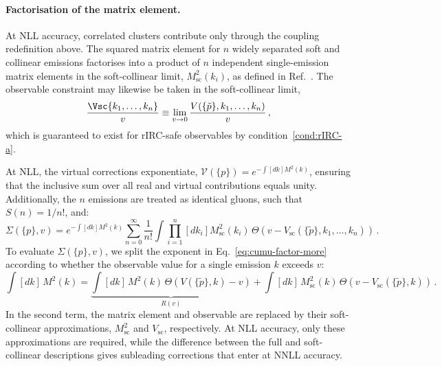\paragraph{Factorisation of the matrix element.} 
At NLL accuracy, correlated clusters contribute only through the 
coupling redefinition above. The squared matrix element for $n$ widely 
separated soft and collinear emissions factorises into a product of 
$n$ independent single-emission matrix elements in the soft-collinear 
limit, $M_{\mathrm{sc}}^2(k_i)$, as defined in 
Ref.~\cite{Banfi:2014sua}. The observable constraint may likewise be 
taken in the soft-collinear limit,  
\begin{equation}
  \label{eq:Vsc}
  \frac{\Vsc{k_1,\dots,k_n}}{v}
  \equiv \lim_{v\to 0}\frac{V(\{\tilde{p}\},k_1,\dots,k_n)}{v}\,,
\end{equation}
which is guaranteed to exist for rIRC-safe observables by condition~\ref{cond:rIRC-a}.

At NLL, the virtual corrections exponentiate, 
$\mathcal{V}(\{p\})=e^{-\int[dk]M^2(k)}$, ensuring
that the inclusive sum over all real and virtual contributions equals
unity. Additionally, the $n$ emissions are treated as identical gluons, such that $S(n)=1/n!$, and:
\begin{equation}
    \label{eq:cumu-factor-more}
    \Sigma\left(\{p\},v\right)=e^{-\int[dk]M^2(k)}\sum_{n=0}^\infty \frac{1}{n!} \int\prod_{i=1}^n\left[dk_i\right]M_{\mathrm{sc}}^2\left(k_i\right)\,\Theta\!\left(v-V_{\mathrm{sc}}\left(\{\tilde{p}\},k_1,\dots,k_n\right)\right)\,.
\end{equation}
To evaluate $\Sigma(\{p\},v)$, we split the exponent in
Eq.~\eqref{eq:cumu-factor-more} according to whether the observable value
for a single emission $k$ exceeds $v$: 
\begin{equation}
\label{eq:exp-rad}
  \int[dk]\,M^2(k)
  = \underbrace{\int[dk]\,M^2(k)\,\Theta\!\left(V(\{\tilde{p}\},k)-v\right)}_{\displaystyle R(v)}+ \int[dk]\,M_{\mathrm{sc}}^2(k)\,\Theta\!\left(v-V_{\mathrm{sc}}(\{\tilde{p}\},k)\right)\,.
\end{equation}
In the second term, the matrix element and observable are replaced by
their soft-collinear approximations, $M_{\mathrm{sc}}^2$ and
$V_{\mathrm{sc}}$, respectively. At NLL accuracy, only these
approximations are required, while the difference between the full and
soft-collinear descriptions gives subleading corrections that enter at
NNLL accuracy.

